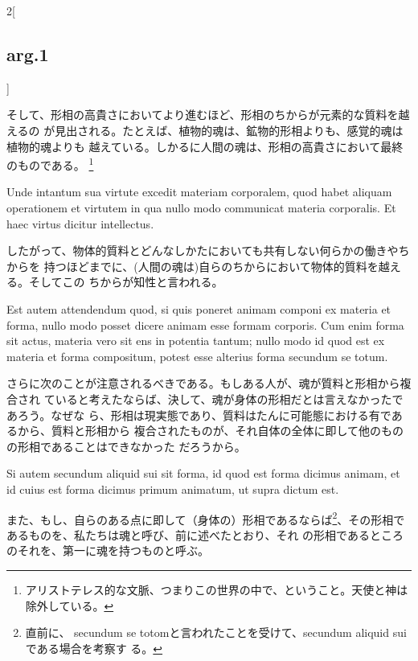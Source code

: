 \documentclass[paper=a4paper,fontsize=10pt,jafontsize=9pt,titlepage]{jlreq}
\begin{document}
\begin{paracol}{2}[\subsection{arg.1}]
\switchcolumn

 そして、形相の高貴さにおいてより進むほど、形相のちからが元素的な質料を越えるの
 が見出される。たとえば、植物的魂は、鉱物的形相よりも、感覚的魂は植物的魂よりも
 越えている。しかるに人間の魂は、形相の高貴さにおいて最終のものである。
 \footnote{アリストテレス的な文脈、つまりこの世界の中で、ということ。天使と神は
 除外している。}
 
\switchcolumn*

 Unde intantum sua virtute excedit materiam corporalem, quod habet aliquam
 operationem et virtutem in qua nullo modo communicat materia corporalis. Et
 haec virtus dicitur intellectus.
 
\switchcolumn

 したがって、物体的質料とどんなしかたにおいても共有しない何らかの働きやちからを
 持つほどまでに、(人間の魂は)自らのちからにおいて物体的質料を越える。そしてこの
 ちからが知性と言われる。
 
\switchcolumn*

 Est autem attendendum quod, si quis poneret animam componi ex materia et forma,
 nullo modo posset dicere animam esse formam corporis. Cum enim forma sit actus,
 materia vero sit ens in potentia tantum; nullo modo id quod est ex materia et
 forma compositum, potest esse alterius forma secundum se totum.
 
\switchcolumn

 さらに次のことが注意されるべきである。もしある人が、魂が質料と形相から複合され
 ていると考えたならば、決して、魂が身体の形相だとは言えなかったであろう。なぜな
 ら、形相は現実態であり、質料はたんに可能態における有であるから、質料と形相から
 複合されたものが、それ自体の全体に即して他のものの形相であることはできなかった
 だろうから。
 
\switchcolumn*

 Si autem secundum aliquid sui sit forma, id quod est forma dicimus animam, et
 id cuius est forma dicimus primum animatum, ut supra dictum est.
 
\switchcolumn

 また、もし、自らのある点に即して（身体の）形相であるならば\footnote{直前に、
 secundum se totomと言われたことを受けて、secundum aliquid suiである場合を考察す
 る。}、その形相であるものを、私たちは魂と呼び、前に述べたとおり、それ
 の形相であるところのそれを、第一に魂を持つものと呼ぶ。
 
\switchcolumn*[\subsection{ad 1}]


\end{paracol}
\end{document}

